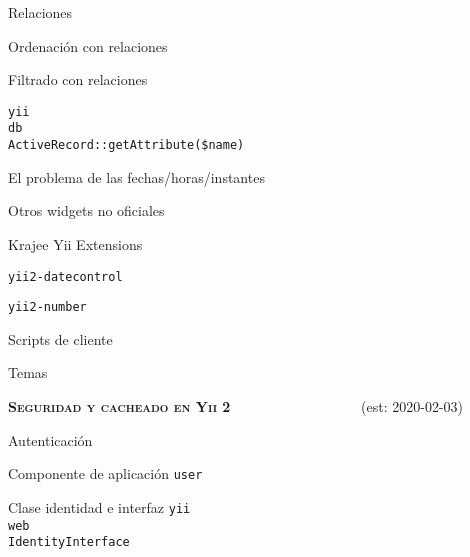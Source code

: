 \begin{longenum}
\begin{longenum}
\begin{longenum}
\begin{longenum}
\begin{longenum}
                \end{longenum}
                \item Relaciones
                \begin{longenum}
                    \item Ordenación con relaciones
                    \item Filtrado con relaciones
                    \begin{longenum}
                        \item \texttt{yii\\db\\ActiveRecord::getAttribute(\$name)}
                    \end{longenum}
                \end{longenum}
            \end{longenum}
            \item El problema de las fechas/horas/instantes
            \item Otros widgets no oficiales
            \begin{longenum}
                \item Krajee Yii Extensions
                \begin{longenum}
                    \item \texttt{yii2-datecontrol}
                    \item \texttt{yii2-number}
                \end{longenum}
            \end{longenum}
        \end{longenum}
        \item Scripts de cliente
        \item Temas \opcional\
    \end{longenum}
    \item \textbf{\textsc{Seguridad y cacheado en Yii 2}} \ \ \ \ \ \ \ \ \ \ \ \ \ \ \ \ \ \ (est: \mbox{2020-02-03})
    \begin{longenum}
        \item Autenticación
        \begin{longenum}
            \item Componente de aplicación \texttt{user}
            \item Clase identidad e interfaz \texttt{yii\\web\\IdentityInterface}

\end{longenum}
\end{longenum}
\end{longenum}

